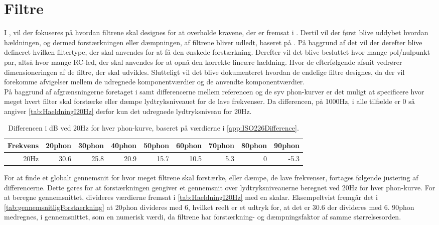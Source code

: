 \section{Filtre}
\label{Filtre}
%
I , vil der fokuseres på hvordan filtrene skal designes for at overholde kravene, der er fremsat i . Dertil vil der først blive uddybet hvordan hældningen, og dermed forstærkningen eller dæmpningen, af filtrene bliver udledt, baseret på . På baggrund af det vil der derefter blive defineret hvilken filtertype, der skal anvendes for at få den ønskede forstærkning. Derefter vil det blive besluttet hvor mange pol/nulpunkt par, altså hvor mange RC-led, der skal anvendes for at opnå den korrekte lineære hældning. Hvor de efterfølgende afsnit vedrører dimensioneringen af de filtre, der skal udvikles. Slutteligt vil det blive dokumenteret hvordan de endelige filtre designes, da der vil forekomme afvigelser mellem de udregnede komponentværdier og de anvendte komponentværdier. \\[5mm] 
%
På baggrund af afgrænsningerne foretaget i  samt differencerne mellem referencen og de syv phon-kurver er det muligt at specificere hvor meget hvert filter skal forstærke eller dæmpe lydtryksniveauet for de lave frekvenser. Da differencen, på 1000Hz, i alle tilfælde er 0 så angiver \autoref{tab:HaeldningI20Hz} derfor kun det udregnede lydtryksniveau for 20Hz.   
%
\begin{table}[H]
\centering
\begin{tabular}{|r|r|r|r|r|r|r|r|r|}
\hline
\multicolumn{1}{|l|}{Frekvens} & \multicolumn{1}{l|}{20phon} & \multicolumn{1}{l|}{30phon} & \multicolumn{1}{l|}{40phon} & \multicolumn{1}{l|}{50phon} & \multicolumn{1}{l|}{60phon} & \multicolumn{1}{l|}{70phon} & \multicolumn{1}{l|}{80phon} & \multicolumn{1}{l|}{90phon} \\ \hline
20Hz & 30.6 & 25.8 & 20.9 & 15.7 & 10.5 & 5.3 & 0 & -5.3 \\ \hline
\end{tabular}
\caption{Differencen i dB ved 20Hz for hver phon-kurve, baseret på værdierne i \autoref{app:ISO226Difference}.}
\label{tab:HaeldningI20Hz}
\end{table}
\noindent
%
For at finde et globalt gennemsnit for hvor meget filtrene skal forstærke, eller dæmpe, de lave frekvenser, fortages følgende justering af differencerne. Dette gøres for at forstærkningen gengiver et gennemsnit over lydtryksniveauerne beregnet ved 20Hz for hver phon-kurve. For at beregne gennemsnittet, divideres værdierne fremsat i \autoref{tab:HaeldningI20Hz} med en skalar. Eksempeltvist fremgår det i \autoref{tab:gennemsnitligForstaerkning} at 20phon divideres med 6, hvilket reelt er et udtryk for, at det er 30.6 der divideres med 6. 90phon medregnes, i gennemsnittet, som en numerisk værdi, da filtrene har forstærkning- og dæmpningsfaktor af samme størrelsesorden.
